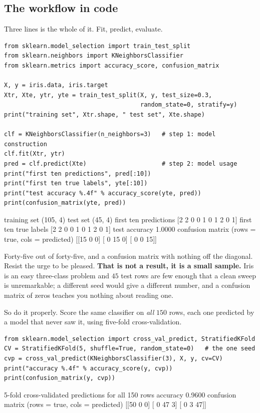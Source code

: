 \documentclass[11pt]{article}
\begin{document}
\subsection{The workflow in code}

Three lines is the whole of it. Fit, predict, evaluate.

\begin{lstlisting}
from sklearn.model_selection import train_test_split
from sklearn.neighbors import KNeighborsClassifier
from sklearn.metrics import accuracy_score, confusion_matrix

X, y = iris.data, iris.target
Xtr, Xte, ytr, yte = train_test_split(X, y, test_size=0.3,
                                      random_state=0, stratify=y)
print("training set", Xtr.shape, " test set", Xte.shape)

clf = KNeighborsClassifier(n_neighbors=3)   # step 1: model construction
clf.fit(Xtr, ytr)
pred = clf.predict(Xte)                     # step 2: model usage
print("first ten predictions", pred[:10])
print("first ten true labels", yte[:10])
print("test accuracy %.4f" % accuracy_score(yte, pred))
print(confusion_matrix(yte, pred))
\end{lstlisting}
\begin{codeout}
training set (105, 4)  test set (45, 4)
first ten predictions [2 2 0 0 1 0 1 2 0 1]
first ten true labels [2 2 0 0 1 0 1 2 0 1]
test accuracy 1.0000
confusion matrix (rows = true, cols = predicted)
[[15  0  0]
 [ 0 15  0]
 [ 0  0 15]]
\end{codeout}

Forty-five out of forty-five, and a confusion matrix with nothing off the
diagonal. Resist the urge to be pleased. \textbf{That is not a result, it is a
small sample.} Iris is an easy three-class problem and $45$ test rows are few
enough that a clean sweep is unremarkable; a different seed would give a
different number, and a confusion matrix of zeros teaches you nothing about
reading one.

So do it properly. Score the same classifier on \emph{all} $150$ rows, each
one predicted by a model that never saw it, using five-fold
cross-validation.

\begin{lstlisting}
from sklearn.model_selection import cross_val_predict, StratifiedKFold
CV = StratifiedKFold(5, shuffle=True, random_state=0)   # the one seed
cvp = cross_val_predict(KNeighborsClassifier(3), X, y, cv=CV)
print("accuracy %.4f" % accuracy_score(y, cvp))
print(confusion_matrix(y, cvp))
\end{lstlisting}
\begin{codeout}
5-fold cross-validated predictions for all 150 rows
accuracy 0.9600
confusion matrix (rows = true, cols = predicted)
[[50  0  0]
 [ 0 47  3]
 [ 0  3 47]]
\end{codeout}
\end{document}
